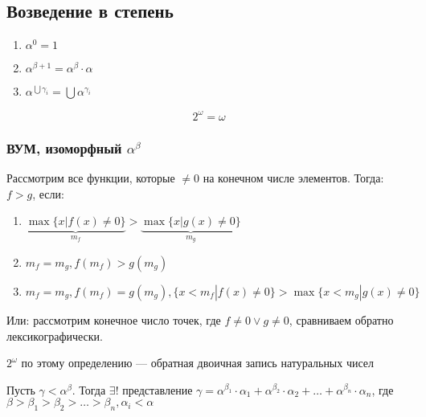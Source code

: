 \subsection{Возведение в степень}
\begin{enumerate}
    \item \(\alpha^0 = 1\)
    \item \(\alpha^{\beta + 1} = \alpha^\beta \cdot \alpha\)
    \item \(\alpha^{\bigcup \gamma_i} = \bigcup \alpha^{\gamma_i}\)
\end{enumerate}
\begin{note}
    \[2^\omega = \omega\]
\end{note}

\subsubsection{ВУМ, изоморфный \(\alpha^\beta\)}
Рассмотрим все функции, которые \(\ne 0\) на конечном числе элементов. Тогда: \(f > g\), если:
\begin{enumerate}
    \item \(\underbrace{\max \{x| f(x) \ne 0\}}_{m_f}  > \underbrace{\max\{x| g(x) \ne 0\}}_{m_g} \)
    \item \(m_f = m_g, f(m_f) > g(m_g)\)
    \item \(m_f = m_g, f(m_f) = g(m_g), \{x < m_f| f(x) \ne 0\} > \max\{x < m_g|g(x) \ne 0\}\)
\end{enumerate}
Или: рассмотрим конечное число точек, где \(f \ne 0 \vee g \ne 0\), сравниваем обратно лексикографически.
\begin{note}
    \(2^\omega\) по этому определению --- обратная двоичная запись натуральных чисел
\end{note}
\begin{theorem}
    Пусть \(\gamma < \alpha^\beta\). Тогда \(\exists!\) представление \(\gamma = \alpha^{\beta_1}\cdot\alpha_1 + \alpha^{\beta_2}\cdot\alpha_2 + \dots + \alpha^{\beta_n}\cdot\alpha_n\), где \(\beta > \beta_1 > \beta_2 > \dots > \beta_n, \alpha_i < \alpha\)
\end{theorem}